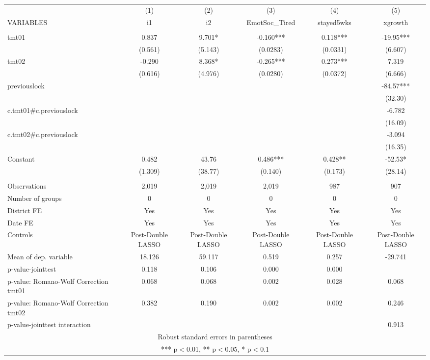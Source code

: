 \documentclass[]{article}
\begin{document}
\begin{tabular}{lccccc} \hline
 & (1) & (2) & (3) & (4) & (5) \\
VARIABLES & i1 & i2 & EmotSoc\_Tired & stayed5wks & xgrowth \\ \hline
 &  &  &  &  &  \\
tmt01 & 0.837 & 9.701* & -0.160*** & 0.118*** & -19.95*** \\
 & (0.561) & (5.143) & (0.0283) & (0.0331) & (6.607) \\
tmt02 & -0.290 & 8.368* & -0.265*** & 0.273*** & 7.319 \\
 & (0.616) & (4.976) & (0.0280) & (0.0372) & (6.666) \\
previouslock &  &  &  &  & -84.57*** \\
 &  &  &  &  & (32.30) \\
c.tmt01\#c.previouslock &  &  &  &  & -6.782 \\
 &  &  &  &  & (16.09) \\
c.tmt02\#c.previouslock &  &  &  &  & -3.094 \\
 &  &  &  &  & (16.35) \\
Constant & 0.482 & 43.76 & 0.486*** & 0.428** & -52.53* \\
 & (1.309) & (38.77) & (0.140) & (0.173) & (28.14) \\
 &  &  &  &  &  \\
Observations & 2,019 & 2,019 & 2,019 & 987 & 907 \\
Number of groups & 0 & 0 & 0 & 0 & 0 \\
District FE & Yes & Yes & Yes & Yes & Yes \\
Date FE & Yes & Yes & Yes & Yes & Yes \\
Controls & Post-Double LASSO & Post-Double LASSO & Post-Double LASSO & Post-Double LASSO & Post-Double LASSO \\
Mean of dep. variable & 18.126 & 59.117 & 0.519 & 0.257 & -29.741 \\
p-value-jointtest & 0.118 & 0.106 & 0.000 & 0.000 &  \\
p-value: Romano-Wolf Correction tmt01 & 0.068 & 0.068 & 0.002 & 0.028 & 0.068 \\
p-value: Romano-Wolf Correction tmt02 & 0.382 & 0.190 & 0.002 & 0.002 & 0.246 \\
 p-value-jointtest interaction &  &  &  &  & 0.913 \\ \hline
\multicolumn{6}{c}{ Robust standard errors in parentheses} \\
\multicolumn{6}{c}{ *** p$<$0.01, ** p$<$0.05, * p$<$0.1} \\
\end{tabular}
\end{document}
